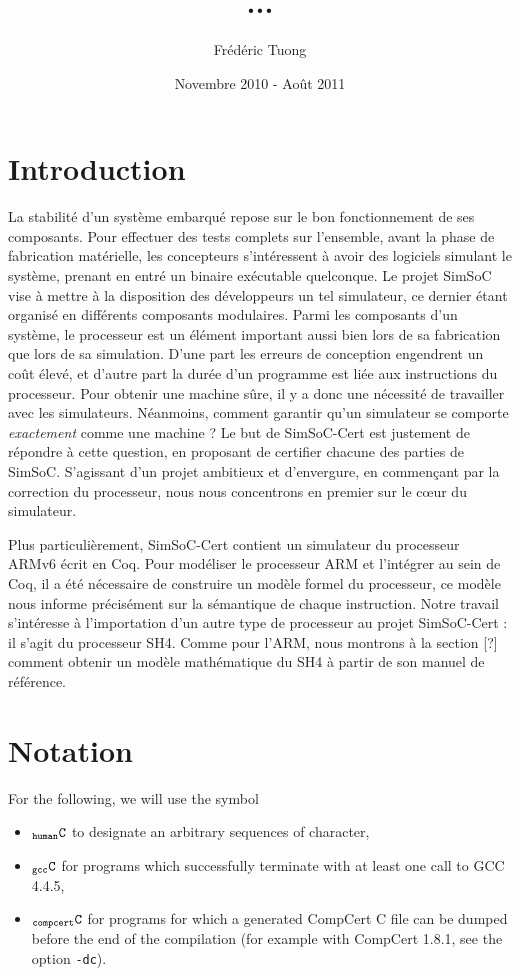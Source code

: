 \documentclass[a4paper, 11pt]{article}
\author{Frédéric Tuong}
\title{...}
\date{Novembre 2010 - Août 2011}
\newcommand{\C}{$_{\tt compcert}{\tt C}$\xspace}
\newcommand{\gccC}{$_{\tt gcc}{\tt C}$\xspace}
\newcommand{\hC}{$_{\tt human}{\tt C}$\xspace}
\begin{document}
\maketitle

\section{Introduction}
La stabilité d'un système embarqué repose sur le bon fonctionnement de ses composants. Pour effectuer des tests complets sur l'ensemble, avant la phase de fabrication matérielle, les concepteurs s'intéressent à avoir des logiciels simulant le système, prenant en entré un binaire exécutable quelconque. Le projet SimSoC vise à mettre à la disposition des développeurs un tel simulateur, ce dernier étant organisé en différents composants modulaires. Parmi les composants d'un système, le processeur est un élément important aussi bien lors de sa fabrication que lors de sa simulation. D'une part les erreurs de conception engendrent un coût élevé, et d'autre part la durée d'un programme est liée aux instructions du processeur. Pour obtenir une machine sûre, il y a donc une nécessité de travailler avec les simulateurs. Néanmoins, comment garantir qu'un simulateur se comporte \emph{exactement} comme une machine ?
Le but de SimSoC-Cert est justement de répondre à cette question, en proposant de certifier chacune des parties de SimSoC. S'agissant d'un projet ambitieux et d'envergure, en commençant par la correction du processeur, nous nous concentrons en premier sur le c\oe ur du simulateur. 

Plus particulièrement, SimSoC-Cert contient un simulateur du processeur ARMv6 écrit en Coq. Pour modéliser le processeur ARM et l'intégrer au sein de Coq, il a été nécessaire de construire un modèle formel du processeur, ce modèle nous informe précisément sur la sémantique de chaque instruction. 
Notre travail s'intéresse à l'importation d'un autre type de processeur au projet SimSoC-Cert : il s'agit du processeur SH4. Comme pour l'ARM, nous montrons à la section [?] comment obtenir un modèle mathématique du SH4 à partir de son manuel de référence.

\section*{Notation}
For the following, we will use the symbol 
\begin{itemize}
\item \hC to designate an arbitrary sequences of character, 
\item \gccC for programs which successfully terminate with at least one call to GCC 4.4.5,
\item \C for programs for which a generated CompCert C file can be dumped before the end of the compilation (for example with CompCert 1.8.1, see the option \verb|-dc|).
\end{itemize}
\end{document}
